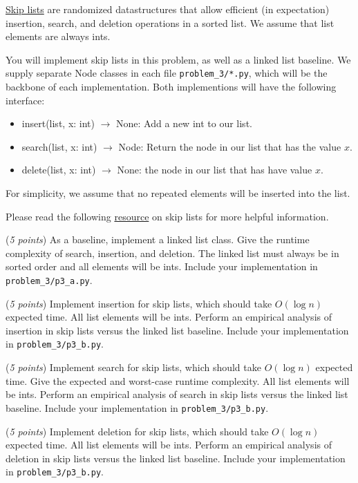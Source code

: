 \documentclass{hw}
\begin{document}
\begin{problem}
\href{https://en.wikipedia.org/wiki/Skip_list}{Skip lists}
are randomized datastructures that allow efficient (in expectation)
insertion, search, and deletion operations in a sorted list.
We assume that list elements are always ints.

You will implement skip lists in this problem, as well as a linked list baseline.
We supply separate Node classes in each file \texttt{problem\_3/*.py}, which will be the backbone of each implementation.
Both implementions will have the following interface:
\begin{itemize}
\item insert(list, x: int) $\rightarrow$ None: Add a new int to our list.
\item search(list, x: int) $\rightarrow$ Node: Return the node in our list that has the value $x$.
\item delete(list, x: int) $\rightarrow$ None: the node in our list that has have value $x$.
\end{itemize}
For simplicity, we assume that no repeated elements will be inserted into the list.

Please read the following
\href{https://ocw.mit.edu/courses/6-046j-introduction-to-algorithms-sma-5503-fall-2005/resources/l12_skiplists/}{resource}
on skip lists for more helpful information.

\begin{subproblem}
(\textit{5 points}) As a baseline, implement a linked list class.
Give the runtime complexity of search, insertion, and deletion.
The linked list must always be in sorted order and all elements will be ints.
Include your implementation in \texttt{problem\_3/p3\_a.py}.
\end{subproblem}
\begin{subproblem}
(\textit{5 points}) Implement insertion for skip lists, which should take $O(\log n)$ expected time.
All list elements will be ints.
Perform an empirical analysis of insertion in skip lists versus the linked list baseline.
Include your implementation in \texttt{problem\_3/p3\_b.py}.
\end{subproblem}
\begin{subproblem}
(\textit{5 points}) Implement search for skip lists, which should take $O(\log n)$ expected time.
Give the expected and worst-case runtime complexity.
All list elements will be ints.
Perform an empirical analysis of search in skip lists versus the linked list baseline.
Include your implementation in \texttt{problem\_3/p3\_b.py}.
\end{subproblem}
\begin{subproblem}
(\textit{5 points}) Implement deletion for skip lists, which should take $O(\log n)$ expected time.
All list elements will be ints.
Perform an empirical analysis of deletion in skip lists versus the linked list baseline.
Include your implementation in \texttt{problem\_3/p3\_b.py}.
\end{subproblem}


\end{problem}
\end{document}
